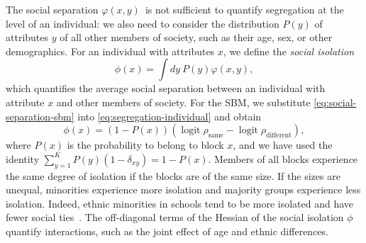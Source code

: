 \documentclass{scrartcl}
\DeclareMathOperator{\logit}{logit}
\begin{document}
\begin{refsection}
The social separation $\varphi(x,y)$ is not sufficient to quantify segregation at the level of an individual: we also need to consider the distribution $P(y)$ of attributes $y$ of all other members of society, such as their age, sex, or other demographics. For an individual with attributes $x$, we define the \emph{social isolation}
\begin{equation}
    \phi(x) = \int dy \ P(y) \varphi(x, y),\label{eq:segregation-individual}
\end{equation}
which quantifies the average social separation between an individual with attribute $x$ and other members of society. For the SBM, we substitute \cref{eq:social-separation-sbm} into \cref{eq:segregation-individual} and obtain
\begin{equation}
    \phi(x) = (1-P(x))\left(\logit\rho_\mathrm{same}-\logit\rho_\mathrm{different}\right),\label{eq:segregation-individual-sbm}
\end{equation}
where $P(x)$ is the probability to belong to block $x$, and we have used the identity $\sum_{y=1}^K P(y)\left(1-\delta_{xy}\right)= 1 - P(x)$. Members of all blocks experience the same degree of isolation if the blocks are of the same size. If the sizes are unequal, minorities experience more isolation and majority groups experience less isolation. Indeed, ethnic minorities in schools tend to be more isolated and have fewer social ties~\cite{Currarini2009}. The off-diagonal terms of the Hessian of the social isolation $\phi$ quantify interactions, such as the joint effect of age and ethnic differences.


\end{refsection}
\end{document}
